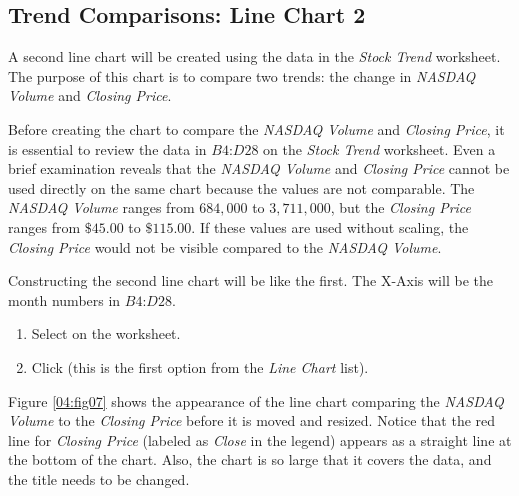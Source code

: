 \subsection{Trend Comparisons: Line Chart 2}

A second line chart will be created using the data in the \textit{Stock Trend} worksheet. The purpose of this chart is to compare two trends: the change in \textit{NASDAQ Volume} and \textit{Closing Price}.

Before creating the chart to compare the \textit{NASDAQ Volume} and \textit{Closing Price}, it is essential to review the data in $ B4 $:$ D28 $ on the \textit{Stock Trend} worksheet. Even a brief examination reveals that the \textit{NASDAQ Volume} and \textit{Closing Price} cannot be used directly on the same chart because the values are not comparable. The \textit{NASDAQ Volume} ranges from $ 684,000 $ to $ 3,711,000 $, but the \textit{Closing Price} ranges from $ \$45.00 $ to $ \$115.00 $. If these values are used without scaling, the \textit{Closing Price} would not be visible compared to the \textit{NASDAQ Volume}.

Constructing the second line chart will be like the first. The X-Axis will be the month numbers in $ B4 $:$ D28 $.

\begin{enumbox}
	\begin{enumerate}
		\item Select  on the  worksheet.
		\item Click  (this is the first option from the \textit{Line Chart} list).
	\end{enumerate}
\end{enumbox}
	
Figure \ref{04:fig07} shows the appearance of the line chart comparing the \textit{NASDAQ Volume} to the \textit{Closing Price} before it is moved and resized. Notice that the red line for \textit{Closing Price} (labeled as \textit{Close} in the legend) appears as a straight line at the bottom of the chart. Also, the chart is so large that it covers the data, and the title needs to be changed.


